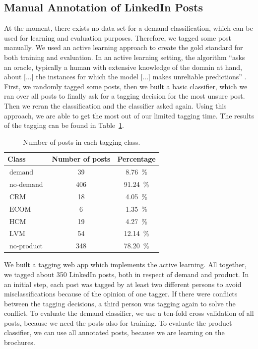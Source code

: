 \subsection{Manual Annotation of LinkedIn Posts}

At the moment, there exists no data set for a demand classification, which can be used for learning and evaluation purposes.
Therefore, we tagged some post manually.
We used an active learning approach to create the gold standard for both training and evaluation.
In an active learning setting, the algorithm ``asks an oracle, typically a human with extensive knowledge of the domain at hand, about [...] the instances for which the model [...] makes unreliable predictions'' \cite{olsson2009literature}.
First, we randomly tagged some posts, then we built a basic classifier, which we ran over all posts to finally ask for a tagging decision for the most unsure post.
Then we reran the classification and the classifier asked again.
Using this approach, we are able to get the most out of our limited tagging time.
The results of the tagging can be found in Table~\ref{table:data_overview}.

\begin{table}[h]
	\centering
	\begin{tabular}{lcc}
		\hline
		\textbf{Class} & \textbf{Number of posts} & \textbf{Percentage} \\
		\hline
		\hline
		$\operatorname{demand}$ & 39 & 8.76~\% \\
		\hline
		$\operatorname{no-demand}$ & 406 & 91.24~\% \\
		\hline
		\hline
		$\operatorname{CRM}$ & 18 & 4.05~\% \\
		\hline
		$\operatorname{ECOM}$ & 6 & 1.35~\% \\
		\hline
		$\operatorname{HCM}$ & 19 & 4.27~\% \\
		\hline
		$\operatorname{LVM}$ & 54 & 12.14~\% \\
		\hline
		$\operatorname{no-product}$ & 348 & 78.20~\% \\
		\hline
	\end{tabular}
	\caption{Number of posts in each tagging class.}
	\label{table:data_overview}
\end{table}

We built a tagging web app which implements the active learning.
All together, we tagged about 350 LinkedIn posts, both in respect of demand and product.
In an initial step, each post was tagged by at least two different persons to avoid misclassifications because of the opinion of one tagger.
If there were conflicts between the tagging decisions, a third person was tagging again to solve the conflict.
To evaluate the demand classifier, we use a ten-fold cross validation of all posts, because we need the posts also for training.
To evaluate the product classifier, we can use all annotated posts, because we are learning on the brochures.

